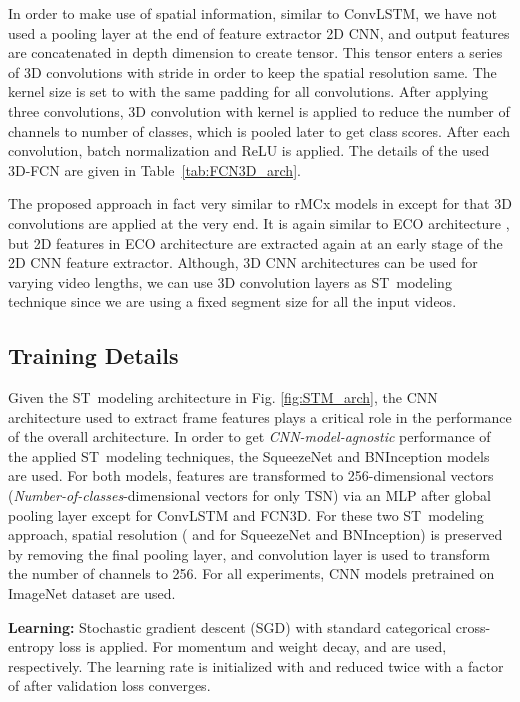 \documentclass[runningheads]{llncs}
\begin{document}
In order to make use of spatial information, similar to ConvLSTM, we have not used a pooling layer at the end of feature extractor 2D CNN, and output features are concatenated in depth dimension to create  tensor. This tensor enters a series of 3D convolutions with stride  in order to keep the spatial resolution same. The kernel size is set to  with the same padding for all convolutions. After applying three convolutions, 3D convolution with  kernel is applied to reduce the number of channels to number of classes, which is pooled later to get class scores. After each convolution, batch normalization and ReLU is applied. The details of the used 3D-FCN are given in \mbox{Table \ref{tab:FCN3D_arch}}. 

The proposed approach in fact very similar to rMCx models in \cite{tran2018closer} except for that 3D convolutions are applied at the very end. It is again similar to ECO architecture \cite{zolfaghari2018eco}, but 2D features in ECO architecture are extracted again at an early stage of the 2D CNN feature extractor. Although, 3D CNN architectures can be used for varying video lengths, we can use 3D convolution layers as ST~modeling technique since we are using a fixed segment size for all the input videos.








\subsection{Training Details}

Given the ST~modeling architecture in Fig. \ref{fig:STM_arch}, the CNN architecture used to extract frame features plays a critical role in the performance of the overall architecture. In order to get \textit{CNN-model-agnostic} performance of the applied ST~modeling techniques, the SqueezeNet and BNInception models are used. For both models, features are transformed to 256-dimensional vectors (\textit{Number-of-classes}-dimensional vectors for only TSN) via an MLP after global pooling layer except for ConvLSTM and FCN3D. For these two ST~modeling approach, spatial resolution ( and  for SqueezeNet and BNInception) is preserved by removing the final pooling layer, and  convolution layer is used to transform the number of channels to 256. For all experiments, CNN models pretrained on ImageNet dataset are used.  

\textbf{Learning:} Stochastic gradient descent (SGD) with standard categorical cross-entropy loss is applied. For momentum and weight decay,  and  are used, respectively. The learning rate is initialized with  and reduced twice with a factor of  after validation loss converges. 
\end{document}
